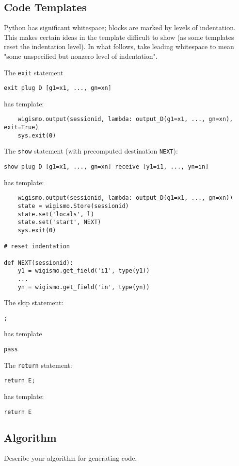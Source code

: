 \documentclass{WigReport}
\begin{document}
\subsection{Code Templates}
Python has significant whitespace; blocks are marked by levels of
indentation. This makes certain ideas in the template difficult to show
(as some templates reset the indentation level). In what follows, take
leading whitespace to mean "some unspecified but nonzero level of
indentation".

\noindent
The {\tt exit} statement

{\tt exit plug D {[}g1=x1, ..., gn=xn{]}}

\noindent
has template:

\begin{verbatim}
    wigismo.output(sessionid, lambda: output_D(g1=x1, ..., gn=xn), exit=True)
    sys.exit(0)
\end{verbatim}

\noindent
The {\tt show} statement (with precomputed destination {\tt NEXT}):

{\tt show plug D [g1=x1, ..., gn=xn] receive [y1=i1, ..., yn=in]}

\noindent
has template:

\begin{verbatim}
    wigismo.output(sessionid, lambda: output_D(g1=x1, ..., gn=xn))
    state = wigismo.Store(sessionid)
    state.set('locals', l)
    state.set('start', NEXT)
    sys.exit(0)

# reset indentation

def NEXT(sessionid):
    y1 = wigismo.get_field('i1', type(y1))
    ...
    yn = wigismo.get_field('in', type(yn))
\end{verbatim}

\noindent
The skip statement:

    {\tt ;}

\noindent
has template

    {\tt pass}

\noindent
The {\tt return} statement:

    {\tt return E;}

\noindent
has template:

    {\tt return E}

\subsection{Algorithm}
Describe your algorithm for generating code.
\end{document}
